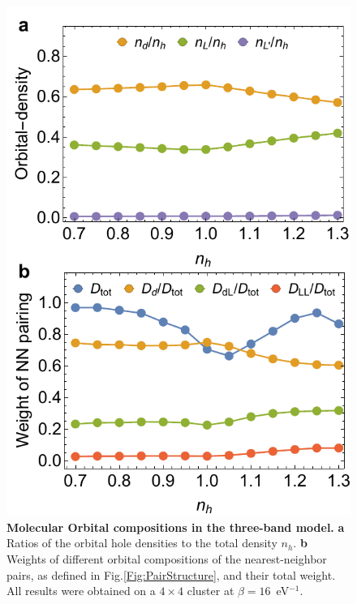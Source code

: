 \documentclass[fleqn,twocolumn,11pt]{wlscirep}
\begin{document}
\begin{figure}[ht]
\centering
\includegraphics[width=\linewidth]{./Figures/Figure4.pdf}
\caption{{\bf Molecular Orbital compositions in the three-band model.} {\bf a} Ratios of the orbital hole densities to the total density $n_h$. {\bf b} Weights of different orbital compositions of the nearest-neighbor pairs, as defined in Fig.\ref{Fig:PairStructure}, and their total weight. All results were obtained on a $4\times4$ cluster at $\beta=16$~eV$^{-1}$. 
}
\label{Fig:weightvsdensity}
\end{figure}
\end{document}

